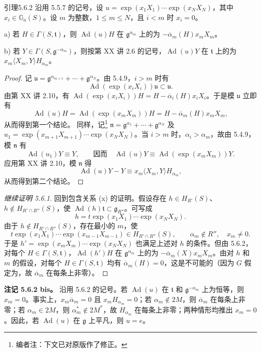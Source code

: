 \begin{SGAresult}{引理}{5.6.2}
沿用 5.5.7 的记号，设 $u=\exp(x_1X_1)\cdots\exp(x_NX_N)$，其中 $x_i\in\mathbb G_a(S)$。设 $m$ 为整数，$1\le m\le N$，且 $i<m$ 时 $x_i=0$。

a) 若 $H\in\Gamma(S,\mathfrak t)$，则 $\operatorname{Ad}(u)H$ 在 $\mathfrak g^{\alpha_m}$ 上的为 $-\overline\alpha_m(H)x_mX_m$。

b) 若 $Y\in\Gamma(S,\mathfrak g^{-\alpha_m})$，则按第 XX 讲 2.6 的记号，$\operatorname{Ad}(u)Y$ 在 $\mathfrak t$ 上的为 $x_m\langle X_m,Y\rangle H_{\alpha_m}$。
\end{SGAresult}
\begin{proof}
记 $\mathfrak u=\mathfrak g^{\alpha_{m+1}}+\cdots+\mathfrak g^{\alpha_N}$。由 5.4.9，$i>m$ 时有
\[\operatorname{Ad}(\exp(x_iX_i))\mathfrak u\subset\mathfrak u.\]
由第 XX 讲 2.10，有 $\operatorname{Ad}(\exp(x_iX_i))H=H-\overline\alpha_i(H)x_iX_i$。于是模 $\mathfrak u$ 立即有
\[\operatorname{Ad}(u)H=\operatorname{Ad}(\exp(x_mX_m))H=H-\overline\alpha_m(H)x_mX_m,\]
从而得到第一个结论。
同样，记\footnote{编者注：下文已对原版作了修正。} $\mathfrak n=\mathfrak g^{\alpha_1}+\cdots+\mathfrak g^{\alpha_N}$ 及 $u_1=\exp(x_{m+1}X_{m+1})\cdots\exp(x_NX_N)$。当 $i>m$ 时，$\alpha_i>\alpha_m$，故由 5.4.9，模 $\mathfrak n$ 有
\[\operatorname{Ad}(u_1)Y\equiv Y,\qquad\text{因而}\quad\operatorname{Ad}(u)Y\equiv\operatorname{Ad}(\exp(x_mX_m))Y.\]
应用第 XX 讲 2.10，模 $\mathfrak n$ 得
\[\operatorname{Ad}(u)Y-Y\equiv x_m\langle X_m,Y\rangle H_{\alpha_m},\]
从而得到第二个结论。
\end{proof}
\begin{proof}[继续证明 5.6.1]
回到包含关系 (x) 的证明。假设存在 $h\in H_{R'}(S)$、$h\notin H_{R'\cap R''}(S)$，使 $\operatorname{Ad}(h)\mathfrak t\subset\mathfrak g_{R''}$。可写成
\[h=t\exp(x_1X_1)\cdots\exp(x_NX_N).\]
由于 $h\notin H_{R'\cap R''}(S)$，存在最小的 $m$，使
\[t\exp(x_1X_1)\cdots\exp(x_{m-1}X_{m-1})\in H_{R'\cap R''}(S),\qquad\alpha_m\notin R'',\quad x_m\ne0.\]
于是 $h'=\exp(x_mX_m)\cdots\exp(x_NX_N)$ 也满足上述对 $h$ 的条件。但由 5.6.2，对每个 $H\in\Gamma(S,\mathfrak t)$，$\operatorname{Ad}(h')H$ 在 $\mathfrak g^{\alpha_m}$ 上的为 $-\overline\alpha_m(X)x_mX_m$。由对 $h$ 和 $m$ 的假设，对每个 $H\in\Gamma(S,\mathfrak t)$ 均有 $\overline\alpha_m(H)=0$，这是不可能的（因为 $G$ 假定为，故 $\overline\alpha_m$ 在每条上非零）。
\end{proof}
\textbf{注记 5.6.2 bis。} 沿用 5.6.2 的记号。若 $\operatorname{Ad}(u)$ 在 $\mathfrak t$ 和 $\mathfrak g^{-\alpha_m}$ 上为恒等，则 $x_m=0$。事实上，$x_m\overline\alpha_m=0$ 且 $x_mH_{\alpha_m}=0$；若 $\alpha_m\notin2M$，则 $\overline\alpha_m$ 在每条上非零；若 $\alpha_m\in2M$，则 $\alpha_m^*\notin2M^*$，故 $H_{\alpha_m}$ 在每条上非零；两种情形均推出 $x_m=0$。因此，若 $\operatorname{Ad}(u)$ 在 $\mathfrak g$ 上平凡，则 $u=e$。

